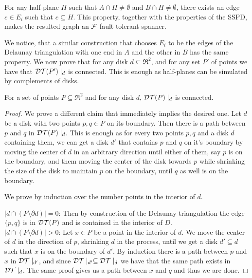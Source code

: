 \documentclass[12pt]{article}%
\begin{document}
For any half-plane $H$ such that $A\cap H\neq \emptyset$ and
$B\cap H\neq \emptyset$, there exists an edge $e\in E_i$ such that
$e\subseteq H$. This property, together with the properties of the
SSPD, makes the resulted graph an $\mathcal{F}$-fault tolerant spanner.

We notice, that a similar construction that chooses $E_i$ to be the
edges of the Delaunay triangulation with one end in $A$ and the other
in $B$ has the same property. We now prove that for any disk
$d\subseteq \Re^2$, and for any set $P'$ of points we have that
$\mathcal{DT}(P')\mid_d$ is connected. This is enough as half-planes can be
simulated by complements of disks.

\begin{claim}
    For a set of points $P\subseteq \Re^2$ and for any disk $d$,
    $\mathcal{DT}(P)\mid_d$ is connected.
\end{claim}

\begin{proof}
    We prove a different claim that immediately implies the desired
    one. Let $d$ be a disk with two points $p,q\in P$ on its
    boundary. Then there is a path between $p$ and $q$ in
    $\mathcal{DT}(P)\mid_d$. This is enough as for every two points $p,q$ and a
    disk $d$ containing them, we can get a disk $d'$ that contains $p$
    and $q$ on it's boundary by moving the center of $d$ in an
    arbitrary direction until either of them, say $p$ is on the
    boundary, and them moving the center of the disk towards $p$ while
    shrinking the size of the disk to maintain $p$ on the boundary,
    until $q$ as well is on the boundary.
    
    We prove by induction over the number points in the interior of
    $d$.
    
    $|d\cap (P\setminus \partial d)| = 0$: Then by construction of the Delaunay triangulation the edge $\{p,q\}$ is in $\mathcal{DT}(P)$ and is contained in the interior of $D$.\\
    
    $|d\cap (P\setminus \partial d)| > 0$: Let $x\in P$ be a point in
    the interior of $d$. We move the center of $d$ in the direction of
    $p$, shrinking $d$ in the process, until we get a disk
    $d'\subseteq d$ such that $x$ is on the boundary of $d'$. By
    induction there is a path between $p$ and $x$ in $\mathcal{DT}\mid_{d'}$,
    and since $\mathcal{DT}\mid_{d'}\subseteq \mathcal{DT}\mid_{d}$ we have that the
    same path exists in $\mathcal{DT}\mid_{d}$. The same proof gives us a path
    between $x$ and $q$ and thus we are done.
    
\end{proof}
\end{document}
